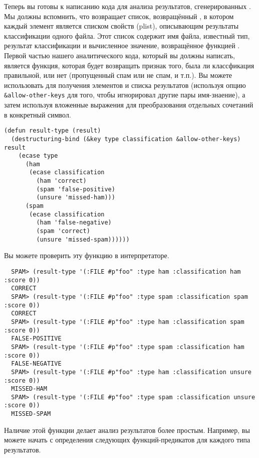 Теперь вы готовы к написанию кода для анализа результатов, сгенерированных
.  Мы должны вспомнить, что  возвращает
список, возвращённый , в котором каждый элемент является списком
свойств (plist), описывающим результаты классификации одного файла.  Этот список содержит
имя файла, известный тип, результат классификации и вычисленное значение, возвращённое
функцией .  Первой частью нашего аналитического кода, который вы должны
написать, является функция, которая будет возвращать признак того, была ли классфикация
правильной, или нет (пропущенный спам или не спам, и т.п.).  Вы можете использовать
 для получения элементов  и 
списка результатов (используя опцию \lstinline!&allow-other-keys! для того, чтобы
 игнорировал другие пары имя-знаение), а затем используя
вложенные выражения  для преобразования отдельных сочетаний в конкретный
символ.

\begin{lstlisting}
(defun result-type (result)
  (destructuring-bind (&key type classification &allow-other-keys) result
    (ecase type
      (ham
       (ecase classification
         (ham 'correct)
         (spam 'false-positive)
         (unsure 'missed-ham)))
      (spam
       (ecase classification
         (ham 'false-negative)
         (spam 'correct)
         (unsure 'missed-spam))))))
\end{lstlisting}

Вы можете проверить эту функцию в интерпретаторе.

\begin{verbatim}
  SPAM> (result-type '(:FILE #p"foo" :type ham :classification ham :score 0))
  CORRECT
  SPAM> (result-type '(:FILE #p"foo" :type spam :classification spam :score 0))
  CORRECT
  SPAM> (result-type '(:FILE #p"foo" :type ham :classification spam :score 0))
  FALSE-POSITIVE
  SPAM> (result-type '(:FILE #p"foo" :type spam :classification ham :score 0))
  FALSE-NEGATIVE
  SPAM> (result-type '(:FILE #p"foo" :type ham :classification unsure :score 0))
  MISSED-HAM
  SPAM> (result-type '(:FILE #p"foo" :type spam :classification unsure :score 0))
  MISSED-SPAM
\end{verbatim}

Наличие этой функции делает анализ результатов  более простым.
Например, вы можете начать с определения следующих функций-предикатов для каждого типа
результатов.

